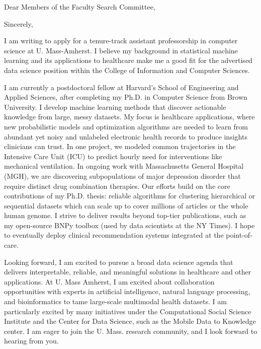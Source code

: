 \documentclass[11pt,letterpaper,roman]{moderncv}        %
\begin{document}
\date{\today}
\opening{Dear Members of the Faculty Search Committee,}
\closing{Sincerely,}

\makelettertitle

I am writing to apply for a tenure-track assistant professorship in computer science at U. Mass-Amherst. I believe my background in statistical machine learning and its applications to healthcare make me a good fit for the advertised data science position within the College of Information and Computer Sciences.

I am currently a postdoctoral fellow at Harvard's School of Engineering and Applied Sciences, after completing my Ph.D. in Computer Science from Brown University.
I develop machine learning methods
that discover actionable knowledge from large, messy datasets. 
My focus is healthcare applications, where new probabilistic models and optimization algorithms are needed to learn from abundant yet noisy and unlabeled electronic health records to produce insights clinicians can trust.
In one project, we modeled common trajectories in the Intensive Care Unit (ICU) to predict hourly need for interventions like mechanical ventilation. In ongoing work with Massachusetts General Hospital (MGH), we are discovering subpopulations of major depression disorder that require distinct drug combination therapies. Our efforts build on the core contributions of my Ph.D. thesis: reliable algorithms for clustering hierarchical or sequential datasets which can scale up to cover millions of articles or the whole human genome.
I strive to deliver results beyond top-tier publications, such as my open-source BNPy toolbox (used by data scientists at the NY Times). I hope to eventually deploy clinical recommendation systems integrated at the point-of-care.

Looking forward, I am excited to pursue
a broad data science agenda that delivers interpretable, reliable, and meaningful solutions in healthcare and other applications.
At U. Mass Amherst, I am excited about collaboration opportunities with experts in artificial intelligence, natural language processing, and bioinformatics to tame large-scale multimodal health datasets. 
I am particularly excited by many initiatives under the Computational Social Science Institute and the Center for Data Science, such as the Mobile Data to Knowledge center. I am eager to join the U. Mass. research community, and I look forward to hearing from you.

\makeletterclosing
\end{document}
